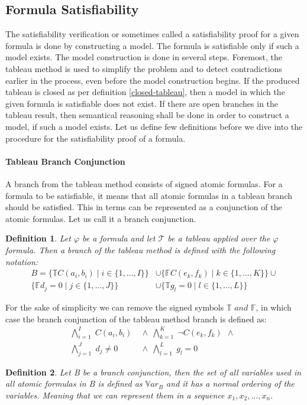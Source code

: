 \documentclass{article}
\newtheorem{defn}{Definition}[section]
\newcommand{\Var}{\mathbb{V}ar}
\newcommand{\signT}{\mathbb{T}}
\newcommand{\signF}{\mathbb{F}}
\newcommand{\BranchConjunction}{%
\begin{align*}
			\bigwedge_{i=1}^{I} \; C(a_i, b_i) \:\: & \wedge \:\: 
			\bigwedge_{k=1}^{K} \; \neg C(e_k, f_k) \:\: \wedge \:\: \\
			\bigwedge_{j=1}^{J} \; d_j \neq 0 \:\: & \wedge \:\:
			\bigwedge_{l=1}^{L} \; g_l = 0 \:\:
\end{align*}%
}
\begin{document}
	\subsection{Formula Satisfiability} \label{formula-satisfiability}
The satisfiability verification or sometimes called a satisfiability proof for a given formula is done by constructing a model. The formula is satisfiable only if such a model exists. The model construction is done in several steps. Foremost, the tableau method is used to simplify the problem and to detect contradictions earlier in the process, even before the model construction begins. If the produced tableau is closed as per definition \ref{closed-tableau}, then a model in which the given formula is satisfiable does not exist. If there are open branches in the tableau result, then semantical reasoning shall be done in order to construct a model, if such a model exists. Let us define few definitions before we dive into the procedure for the satisfiability proof of a formula.

	\paragraph{Tableau Branch Conjunction}
		A branch from the tableau method consists of signed atomic formulas. For a formula to be satisfiable, it means that all atomic formulas in a tableau branch should be satisfied. This in terms can be represented as a conjunction of the atomic formulas. Let us call it a branch conjunction.
	\begin{defn}
		Let $\varphi$ be a formula and let $\mathcal{T}$ be a tableau applied over the $\varphi$ formula. Then a branch of the tableau method is defined with the following notation:
		\begin{align*}
				B = \{\signT C(a_i, b_i) \mid i \in \{1, \ldots, I\} \} &\cup 
					\{\signF C(e_k, f_k) \mid k \in \{1, \ldots, K\} \} \cup \\
					\{\signF d_j = 0 \mid j \in \{1, \ldots, J\} \} &\cup 
					\{\signT g_l = 0 \mid l \in \{1, \ldots, L\} \}
		\end{align*}
	\end{defn}
	For the sake of simplicity we can remove the signed symbols $\signT \textit{ and } \signF$, in which case the branch conjunction of the tableau method branch is defined as:
	\BranchConjunction

	\begin{defn}
		Let B be a branch conjunction, then the set of all variables used in all atomic formulas in B is defined as $\Var_B$ and it has a normal ordering of the variables. Meaning that we can represent them in a sequence $x_1, x_2, ..., x_n$.
	\end{defn}
\end{document}
